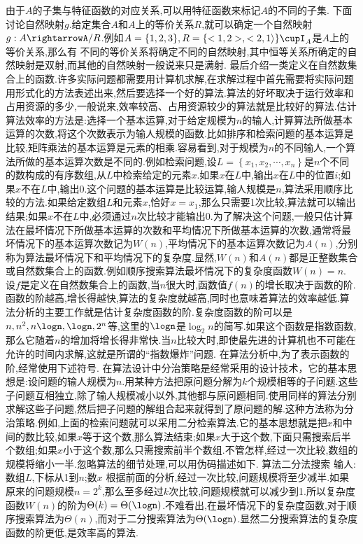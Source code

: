 由于$A$的子集与特征函数的对应关系,可以用特征函数来标记$A$的不同的子集.
下面讨论自然映射$g$.给定集合$A$和$A$上的等价关系$R$,就可以确定一个自然映射$g:A\rightarrowA/R$.例如$A=\{1,2,3\},R=\{<1,2>,<2,1\rangle\}\cupI_{A}$是$A$上的等价关系,那么有
不同的等价关系将确定不同的自然映射,其中恒等关系所确定的自然映射是双射,而其他的自然映射一般说来只是满射.
最后介绍一类定义在自然数集合上的函数.许多实际问题都需要用计算机求解,在求解过程中首先需要将实际问题用形式化的方法表述出来,然后要选择一个好的算法.算法的好坏取决于运行效率和占用资源的多少,一般说来,效率较高、占用资源较少的算法就是比较好的算法.估计算法效率的方法是:选择一个基本运算,对于给定规模为$n$的输人,计算算法所做基本运算的次数,将这个次数表示为输人规模的函数.比如排序和检索问题的基本运算是比较,矩阵乘法的基本运算是元素的相乘.容易看到,对于规模为$n$的不同输人,一个算法所做的基本运算次数是不同的.例如检索问题,设$L=\left\{x_{1},x_{2},\cdots,x_{n}\right\}$是$n$个不同的数构成的有序数组,从$L$中检索给定的元素$x$.如果$x$在$L$中,输出$x$在$L$中的位置$i$;如果$x$不在$L$中,输出0.这个问题的基本运算是比较运算,输人规模是$n$,算法采用顺序比较的方法.如果给定数组$L$和元素$x$,恰好$x=x_{1}$,那么只需要1次比较,算法就可以输出结果;如果$x$不在$L$中,必须通过$n$次比较才能输出0.为了解决这个问题,一般只估计算法在最坏情况下所做基本运算的次数和平均情况下所做基本运算的次数,通常将最坏情况下的基本运算次数记为$W(n)$,平均情况下的基本运算次数记为$A(n)$,分别称为算法最坏情况下和平均情况下的复杂度.显然,$W(n)$和$A(n)$都是正整数集合或自然数集合上的函数.例如顺序搜索算法最坏情况下的复杂度函数$W(n)=n$.
设$f$是定义在自然数集合上的函数,当$n$很大时,函数值$f(n)$的增长取决于函数的阶.函数的阶越高,增长得越快,算法的复杂度就越高,同时也意味着算法的效率越低.算法分析的主要工作就是估计复杂度函数的阶.复杂度函数的阶可以是$n,n^{2},n\logn,\logn,2^{n}$等,这里的$\logn$是$\log_{2}n$的简写.如果这个函数是指数函数,那么它随着$n$的增加将增长得非常快.当$n$比较大时,即使最先进的计算机也不可能在允许的时间内求解,这就是所谓的“指数爆炸”问题.
在算法分析中,为了表示函数的阶,经常使用下述符号.
在算法设计中分治策略是经常采用的设计技术，它的基本思想是:设问题的输人规模为$n$.用某种方法把原问题分解为$k$个规模相等的子问题.这些子问题互相独立,除了输人规模减小以外,其他都与原问题相同.使用同样的算法分别求解这些子问题,然后把子问题的解组合起来就得到了原问题的解.这种方法称为分治策略.例如,上面的检索问题就可以采用二分检索算法.它的基本思想就是把$x$和中间的数比较,如果$x$等于这个数,那么算法结束;如果$x$大于这个数,下面只需搜索后半个数组;如果$x$小于这个数,那么只需搜索前半个数组.不管怎样,经过一次比较,数组的规模将缩小一半.忽略算法的细节处理,可以用伪码描述如下.
{算法二分法搜索}
输人:数组$L$,下标从1到$n$;数$x$
根据前面的分析,经过一次比较,问题规模将至少减半.如果原来的问题规模$n=2^{k}$,那么至多经过$k$次比较,问题规模就可以减少到1.所以复杂度函数$W(n)$的阶为$\Theta(k)=\Theta(\logn)$.不难看出,在最坏情况下的复杂度函数,对于顺序搜索算法为$\Theta(n)$,而对于二分搜索算法为$\Theta(\logn)$.显然二分搜索算法的复杂度函数的阶更低,是效率高的算法.
